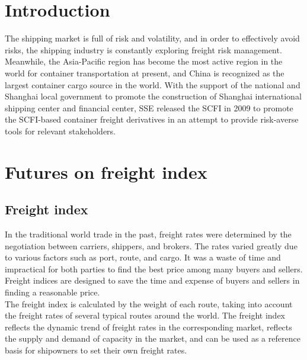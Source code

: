 \documentclass{aas}
\begin{document}
\onecolumn\begin{multicols}{2}

	\setcounter{section}{-1}

	\section{\textbf{Introduction}}

	The shipping market is full of risk and volatility, and in order to effectively avoid risks, the shipping industry is constantly exploring freight risk management. Meanwhile, the Asia-Pacific region has become the most active region in the world for container transportation at present, and China is recognized as the largest container cargo source in the world. With the support of the national and Shanghai local government to promote the construction of Shanghai international shipping center and financial center, SSE released the SCFI in 2009 to promote the SCFI-based container freight derivatives in an attempt to provide risk-averse tools for relevant stakeholders. \\

	\section{\textbf{Futures on freight index}}

	\subsection{Freight index}

	In the traditional world trade in the past, freight rates were determined by the negotiation between carriers, shippers, and brokers. The rates varied greatly due to various factors such as port, route, and cargo. It was a waste of time and impractical for both parties to find the best price among many buyers and sellers. Freight indices are designed to save the time and expense of buyers and sellers in finding a reasonable price. \\

	The freight index is calculated by the weight of each route, taking into account the freight rates of several typical routes around the world. The freight index reflects the dynamic trend of freight rates in the corresponding market, reflects the supply and demand of capacity in the market, and can be used as a reference basis for shipowners to set their own freight rates. \\


\end{multicols}
\end{document}
